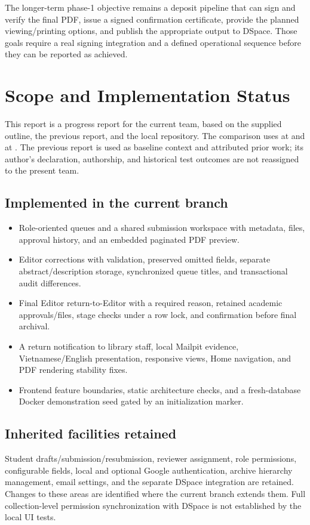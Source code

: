 \documentclass[11pt,a4paper]{report}
\newcommand{\code}[1]{{\small\texttt{\detokenize{#1}}}}
\begin{document}
The longer-term phase-1 objective remains a deposit pipeline that can sign and verify the final PDF, issue a signed confirmation certificate, provide the planned viewing/printing options, and publish the appropriate output to DSpace. Those goals require a real signing integration and a defined operational sequence before they can be reported as achieved.

\section{Scope and Implementation Status}
This report is a progress report for the current team, based on the supplied \code{main.tex} outline, the previous report, and the local repository. The comparison uses \code{main} at \code{4f7a73df} and \code{UI-build} at \code{3d97faf3}. The previous report is used as baseline context and attributed prior work; its author's declaration, authorship, and historical test outcomes are not reassigned to the present team.

\subsection*{Implemented in the current branch}
\begin{itemize}
  \item Role-oriented queues and a shared submission workspace with metadata, files, approval history, and an embedded paginated PDF preview.
  \item Editor corrections with validation, preserved omitted fields, separate abstract/description storage, synchronized queue titles, and transactional audit differences.
  \item Final Editor return-to-Editor with a required reason, retained academic approvals/files, stage checks under a row lock, and confirmation before final archival.
  \item A return notification to library staff, local Mailpit evidence, Vietnamese/English presentation, responsive views, Home navigation, and PDF rendering stability fixes.
  \item Frontend feature boundaries, static architecture checks, and a fresh-database Docker demonstration seed gated by an initialization marker.
\end{itemize}

\subsection*{Inherited facilities retained}
Student drafts/submission/resubmission, reviewer assignment, role permissions, configurable fields, local and optional Google authentication, archive hierarchy management, email settings, and the separate DSpace integration are retained. Changes to these areas are identified where the current branch extends them. Full collection-level permission synchronization with DSpace is not established by the local UI tests.
\end{document}
